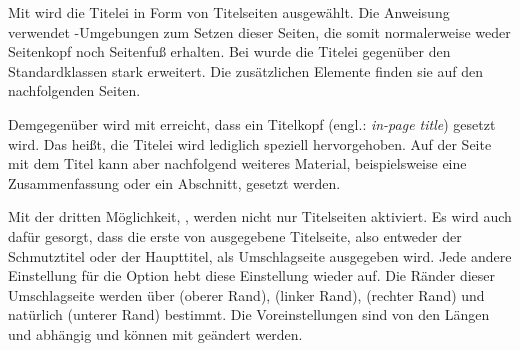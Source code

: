 Mit 
wird die Titelei
in Form von Titelseiten ausgewählt. Die Anweisung
 verwendet
-Umgebungen zum Setzen dieser
Seiten, die somit normalerweise weder Seitenkopf noch Seitenfuß erhalten. Bei
{\KOMAScript} wurde die Titelei gegenüber den Standardklassen stark
erweitert. Die zusätzlichen Elemente finden sie auf den nachfolgenden Seiten.

Demgegenüber wird mit
erreicht, dass ein Titelkopf (engl.: \emph{in-page title}) gesetzt wird. Das
heißt, die Titelei wird lediglich speziell hervorgehoben. Auf der Seite mit
dem Titel kann aber nachfolgend weiteres Material, beispielsweise eine
Zusammenfassung oder ein Abschnitt, gesetzt werden.

Mit%
 der dritten Möglichkeit, %
, werden nicht nur
Titelseiten aktiviert. Es wird auch dafür gesorgt, dass die erste von
 ausgegebene Titelseite,
also entweder der Schmutztitel oder der Haupttitel, als
Umschlagseite ausgegeben wird. Jede andere Einstellung für die
Option  hebt diese Einstellung wieder auf. Die
Ränder dieser Umschlagseite werden
über  (oberer Rand), 
(linker Rand),  (rechter Rand) und natürlich
 (unterer Rand) bestimmt. Die Voreinstellungen
sind von den Längen  und
 abhängig und können mit
 geändert werden.

%
%
\EndIndexGroup


